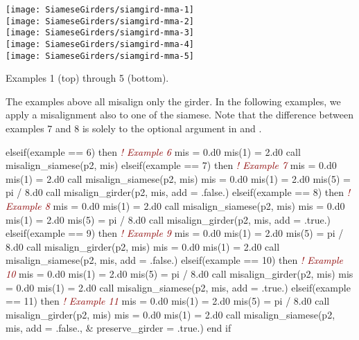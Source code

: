 \begin{MarginFigure}[-13.1cm]\forcerectofloat
  \texttt{[image: SiameseGirders/siamgird-mma-1]}%
  \makebox[0pt]{\textcolor{DarkRed}{1}}\\[14pt]\noindent
  \texttt{[image: SiameseGirders/siamgird-mma-2]}%
  \makebox[0pt]{\textcolor{DarkRed}{2}}\\[14pt] \noindent
  \texttt{[image: SiameseGirders/siamgird-mma-3]}%
  \makebox[0pt]{\textcolor{DarkRed}{3}}\\[14pt] \noindent
  \texttt{[image: SiameseGirders/siamgird-mma-4]}%
  \makebox[0pt]{\textcolor{DarkRed}{4}}\\[14pt] \noindent
  \texttt{[image: SiameseGirders/siamgird-mma-5]}%
  \makebox[0pt]{\textcolor{DarkRed}{5}}
  \caption{Examples 1 (top) through 5 (bottom).}
\end{MarginFigure}

The examples above all misalign only the girder. In the following examples, we apply a misalignment also to one of the siamese. Note that the difference between examples 7 and 8 is solely to the optional argument  in  and .
%
\begin{ptccode}
elseif(example == 6) then        \textcolor{DarkRed}{\textsl{! Example 6}}
  mis = 0.d0
  mis(1) = 2.d0
  call misalign_siamese(p2, mis)
elseif(example == 7) then        \textcolor{DarkRed}{\textsl{! Example 7}}
  mis = 0.d0
  mis(1) = 2.d0
  call misalign_siamese(p2, mis)
  mis = 0.d0
  mis(1) = 2.d0
  mis(5) = pi / 8.d0
  call misalign_girder(p2, mis, add = .false.) \label{lin:mis.x7}
elseif(example == 8) then        \textcolor{DarkRed}{\textsl{! Example 8}}
  mis = 0.d0
  mis(1) = 2.d0
  call misalign_siamese(p2, mis)
  mis = 0.d0
  mis(1) = 2.d0
  mis(5) = pi / 8.d0
  call misalign_girder(p2, mis, add = .true.) \label{lin:mis.x8}
elseif(example == 9) then        \textcolor{DarkRed}{\textsl{! Example 9}}
  mis = 0.d0
  mis(1) = 2.d0
  mis(5) = pi / 8.d0
  call misalign_girder(p2, mis)
  mis = 0.d0
  mis(1) = 2.d0
  call misalign_siamese(p2, mis, add = .false.)
elseif(example == 10) then       \textcolor{DarkRed}{\textsl{! Example 10}}
  mis = 0.d0
  mis(1) = 2.d0
  mis(5) = pi / 8.d0
  call misalign_girder(p2, mis)
  mis = 0.d0
  mis(1) = 2.d0
  call misalign_siamese(p2, mis, add = .true.)
elseif(example == 11) then       \textcolor{DarkRed}{\textsl{! Example 11}}
  mis = 0.d0
  mis(1) = 2.d0
  mis(5) = pi / 8.d0
  call misalign_girder(p2, mis)
  mis = 0.d0
  mis(1) = 2.d0
  call misalign_siamese(p2, mis, add = .false., &
                        preserve_girder = .true.)
end if
\end{ptccode}

